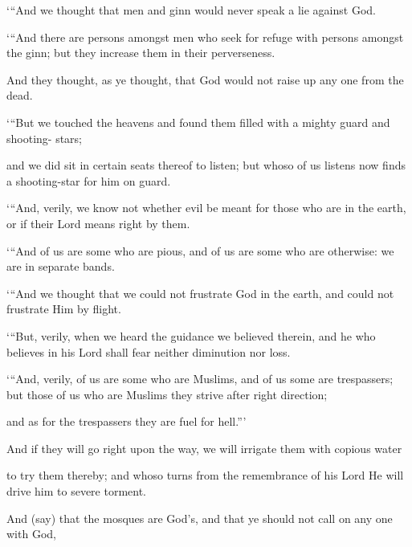\documentclass[fontsize=14pt, letterpaper, notitlepage, openany, DIV=12]{scrbook} %
\begin{document}
\noindent[72:5]
`\hspace{0.1em}``And we thought that men and ginn would never speak a lie against God.

\noindent[72:6]
`\hspace{0.1em}``And there are persons amongst men who seek for refuge with persons amongst the
ginn; but they increase them in their perverseness.

\noindent[72:7]
And they thought, as ye thought, that God would not raise up any one from the dead.

\noindent[72:8]
`\hspace{0.1em}``But we touched the heavens and found them filled with a mighty guard and shooting-
stars;

\noindent[72:9]
and we did sit in certain seats thereof to listen; but whoso of us listens now finds a
shooting-star for him on guard.

\noindent[72:10]
`\hspace{0.1em}``And, verily, we know not whether evil be meant for those who are in the earth, or if
their Lord means right by them.

\noindent[72:11]
`\hspace{0.1em}``And of us are some who are pious, and of us are some who are otherwise: we are in
separate bands.

\noindent[72:12]
`\hspace{0.1em}``And we thought that we could not frustrate God in the earth, and could not frustrate
Him by flight.

\noindent[72:13]
`\hspace{0.1em}``But, verily, when we heard the guidance we believed therein, and he who believes in his
Lord shall fear neither diminution nor loss.

\noindent[72:14]
`\hspace{0.1em}``And, verily, of us are some who are Muslims, and of us some are trespassers; but those
of us who are Muslims they strive after right direction;

\noindent[72:15]
and as for the trespassers they are fuel for hell.''\hspace{0.1em}'

\noindent[72:16]
And if they will go right upon the way, we will irrigate them with copious water

\noindent[72:17]
to try them thereby; and whoso turns from the remembrance of his Lord He will drive
him to severe torment.

\noindent[72:18]
And (say) that the mosques are God's, and that ye should not call on any one with God,
\end{document}
